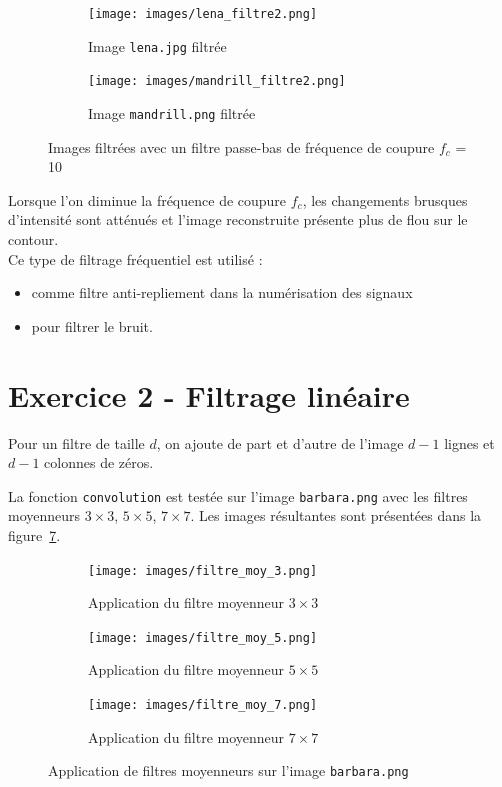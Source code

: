 \documentclass[a4paper]{article}
\newcommand{\figref}[1]{figure~\ref{#1}}
\begin{document}
\begin{figure}[H]
    \centering
    \begin{subfigure}[c]{0.46\textwidth}
        \centering
        \texttt{[image: images/lena\_filtre2.png]}
        \caption{Image \texttt{lena.jpg} filtrée} 
    \label{subfig:lena-filtre-2}
    \end{subfigure}
    \begin{subfigure}[c]{0.46\textwidth}
        \centering
        \texttt{[image: images/mandrill\_filtre2.png]}
        \caption{Image \texttt{mandrill.png} filtrée} 
    \label{subfig:mandrill-filtre2}
    \end{subfigure}
    \caption{Images filtrées avec un filtre passe-bas de fréquence de coupure
    $f_c$ = 10}
    \label{fig:filtrage-lena1}
\end{figure}


Lorsque l'on diminue la fréquence de coupure $f_c$, les changements brusques
d'intensité sont atténués et l'image reconstruite présente plus de flou sur le
contour. \\

Ce type de filtrage fréquentiel est utilisé :
\begin{itemize}
    \item comme filtre anti-repliement dans la numérisation des signaux
    \item pour filtrer le bruit.
\end{itemize}

\section*{Exercice 2 - Filtrage linéaire}

Pour un filtre de taille $d$, on ajoute de part et d'autre de l'image $d-1$
lignes et $d-1$ colonnes de zéros.

La fonction \texttt{convolution} est testée sur l'image \texttt{barbara.png}
avec les filtres moyenneurs $3 \times 3$, $5 \times 5$, $7 \times 7$. Les images
résultantes sont présentées dans la \figref{fig:filtre-moy}.

\begin{figure}[H]
    \centering
    \begin{subfigure}[c]{0.3\textwidth}
        \centering
        \texttt{[image: images/filtre\_moy\_3.png]}
        \caption{Application du filtre moyenneur $3 \times 3$} 
        \label{subfig:filtre-moy-3}
    \end{subfigure}
    \begin{subfigure}[c]{0.3\textwidth}
        \centering
        \texttt{[image: images/filtre\_moy\_5.png]}
        \caption{Application du filtre moyenneur $5 \times 5$} 
        \label{subfig:filtre-moy-5}
    \end{subfigure}
    \begin{subfigure}[c]{0.3\textwidth}
        \centering
        \texttt{[image: images/filtre\_moy\_7.png]}
        \caption{Application du filtre moyenneur $7 \times 7$} 
        \label{subfig:filtre-moy-7}
    \end{subfigure}
    \caption{Application de filtres moyenneurs sur l'image \texttt{barbara.png}}
    \label{fig:filtre-moy}
\end{figure}
\end{document}
